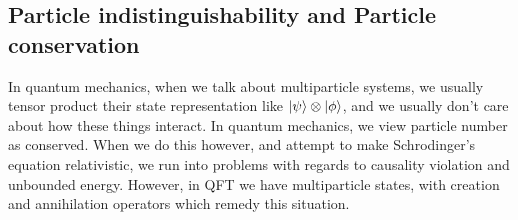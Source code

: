 \subsection{Particle indistinguishability and Particle conservation}
In quantum mechanics, when we talk about multiparticle systems, we usually tensor product their state representation like $\ket{\psi} \otimes \ket{\phi}$, and we usually don't care about how these things interact. In quantum mechanics, we view particle number as conserved. When we do this however, and attempt to make Schrodinger's equation relativistic, we run into problems with regards to causality violation and unbounded energy. However, in QFT we have multiparticle states, with creation and annihilation operators which remedy this situation. 

